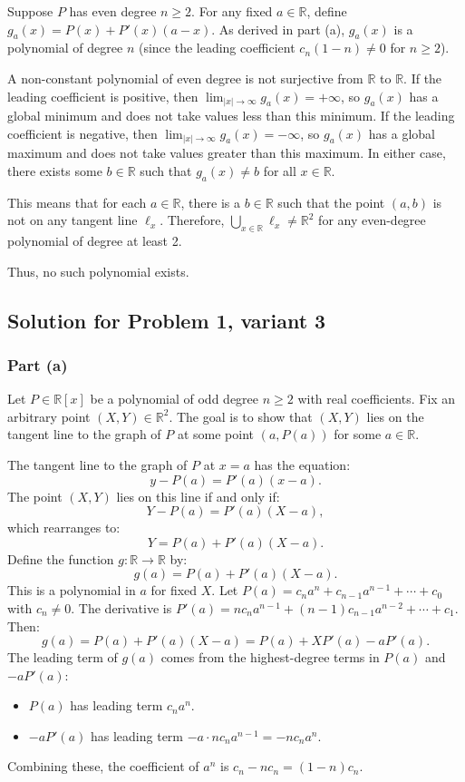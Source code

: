 \documentclass[12pt,a4paper]{article}
\theoremstyle{definition}
\begin{document}
Suppose $P$ has even degree $n \geq 2$. For any fixed $a \in \mathbb{R}$, define $g_a(x) = P(x) + P'(x)(a - x)$. As derived in part (a), $g_a(x)$ is a polynomial of degree $n$ (since the leading coefficient $c_n (1 - n) \neq 0$ for $n \geq 2$).

A non-constant polynomial of even degree is not surjective from $\mathbb{R}$ to $\mathbb{R}$. If the leading coefficient is positive, then $\lim_{|x| \to \infty} g_a(x) = +\infty$, so $g_a(x)$ has a global minimum and does not take values less than this minimum. If the leading coefficient is negative, then $\lim_{|x| \to \infty} g_a(x) = -\infty$, so $g_a(x)$ has a global maximum and does not take values greater than this maximum. In either case, there exists some $b \in \mathbb{R}$ such that $g_a(x) \neq b$ for all $x \in \mathbb{R}$.

This means that for each $a \in \mathbb{R}$, there is a $b \in \mathbb{R}$ such that the point $(a, b)$ is not on any tangent line $\ell_x$. Therefore, $\bigcup_{x \in \mathbb{R}} \ell_x \neq \mathbb{R}^2$ for any even-degree polynomial of degree at least 2.

Thus, no such polynomial exists.

    \subsection{Solution for Problem 1, variant 3}

    \subsubsection*{Part (a)}
    Let $P \in \mathbb{R}[x]$ be a polynomial of odd degree $n \geq 2$ with real coefficients. Fix an arbitrary point $(X, Y) \in \mathbb{R}^2$. The goal is to show that $(X, Y)$ lies on the tangent line to the graph of $P$ at some point $(a, P(a))$ for some $a \in \mathbb{R}$.

    The tangent line to the graph of $P$ at $x = a$ has the equation:
    \[
        y - P(a) = P'(a)(x - a).
    \]
    The point $(X, Y)$ lies on this line if and only if:
    \[
        Y - P(a) = P'(a)(X - a),
    \]
    which rearranges to:
    \[
        Y = P(a) + P'(a)(X - a).
    \]
    Define the function $g: \mathbb{R} \to \mathbb{R}$ by:
    \[
        g(a) = P(a) + P'(a)(X - a).
    \]
    This is a polynomial in $a$ for fixed $X$. Let $P(a) = c_n a^n + c_{n-1} a^{n-1} + \cdots + c_0$ with $c_n \neq 0$. The derivative is $P'(a) = n c_n a^{n-1} + (n-1) c_{n-1} a^{n-2} + \cdots + c_1$. Then:
    \[
        g(a) = P(a) + P'(a)(X - a) = P(a) + X P'(a) - a P'(a).
    \]
    The leading term of $g(a)$ comes from the highest-degree terms in $P(a)$ and $-a P'(a)$:
    \begin{itemize}
        \item $P(a)$ has leading term $c_n a^n$.
        \item $-a P'(a)$ has leading term $-a \cdot n c_n a^{n-1} = -n c_n a^n$.
    \end{itemize}
    Combining these, the coefficient of $a^n$ is $c_n - n c_n = (1 - n) c_n$.
\end{document}

